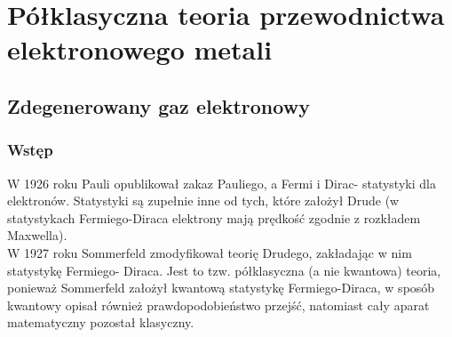 \section{Półklasyczna teoria przewodnictwa elektronowego metali}
\subsection{Zdegenerowany gaz elektronowy}
 \subsubsection{Wstęp}
 W 1926 roku Pauli opublikował zakaz Pauliego, a Fermi i Dirac- statystyki dla elektronów. Statystyki są zupełnie inne od tych, które założył Drude (w statystykach Fermiego-Diraca elektrony mają prędkość zgodnie z rozkładem Maxwella).\\
 W 1927 roku Sommerfeld zmodyfikował teorię Drudego, zakładając w nim statystykę Fermiego- Diraca. Jest to tzw. półklasyczna (a nie kwantowa) teoria, ponieważ Sommerfeld założył kwantową statystykę Fermiego-Diraca, w sposób kwantowy opisał również prawdopodobieństwo przejść, natomiast cały aparat matematyczny pozostał klasyczny.
